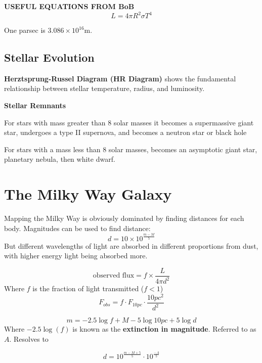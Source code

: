 \textbf{USEFUL EQUATIONS FROM BoB}
\begin{equation}
	\label{stefan-boltzmann}
	L=4\pi R^{2}\sigma T^{4}
\end{equation}

One parsec is $3.086 \times 10^{16}$m.

\subsection{Stellar Evolution}
\textbf{Herztsprung-Russel Diagram (HR Diagram)} shows the fundamental relationship between stellar temperature, radius, and luminosity.

\hfill

\textbf{Stellar Remnants}

For stars with mass greater than 8 solar masses it becomes a supermassive giant star, undergoes a type II supernova, and becomes a neutron star or black hole

For stars with a mass less than 8 solar masses, becomes an asymptotic giant star, planetary nebula, then white dwarf. 


\section{The Milky Way Galaxy}
Mapping the Milky Way is obviously dominated by finding distances for each body. Magnitudes can be used to find distance:
\begin{equation}
	\label{}
	d=10 \times 10^{\frac{m-M}{5}}
\end{equation}
But different wavelengths of light are absorbed in different proportions from dust, with higher energy light being absorbed more. 

\begin{equation}
	\label{}
	\mbox{observed flux} = f \times  \frac{L}{4\pi d^{2}}
\end{equation}
Where $f$ is the fraction of light transmitted ($f<1$)
\begin{equation}
	\label{}
	F_{obs}=f \cdot F_{10pc}\cdot  \frac{10pc^{2}}{d^{2}}
\end{equation}

\begin{equation}
	\label{}
	m=-2.5\log{f}+M-5\log{10pc}+5\log{d}
\end{equation}
Where $-2.5\log(f)$ is known as the \textbf{extinction in magnitude}. Referred to as $A$. Resolves to

\begin{equation}
	\label{}
	d=10^{\frac{m-M+5}{5}} \cdot 10^{\frac{-A}{5}}
\end{equation}


